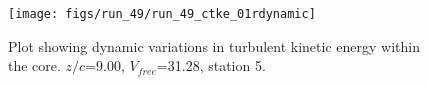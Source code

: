 \begin{figure}[H]
\centering
\texttt{[image: figs/run\_49/run\_49\_ctke\_01rdynamic]}
\caption{Plot showing dynamic variations in turbulent kinetic energy within the core. $z/c$=9.00, $V_{free}$=31.28, station 5.}
\end{figure}


